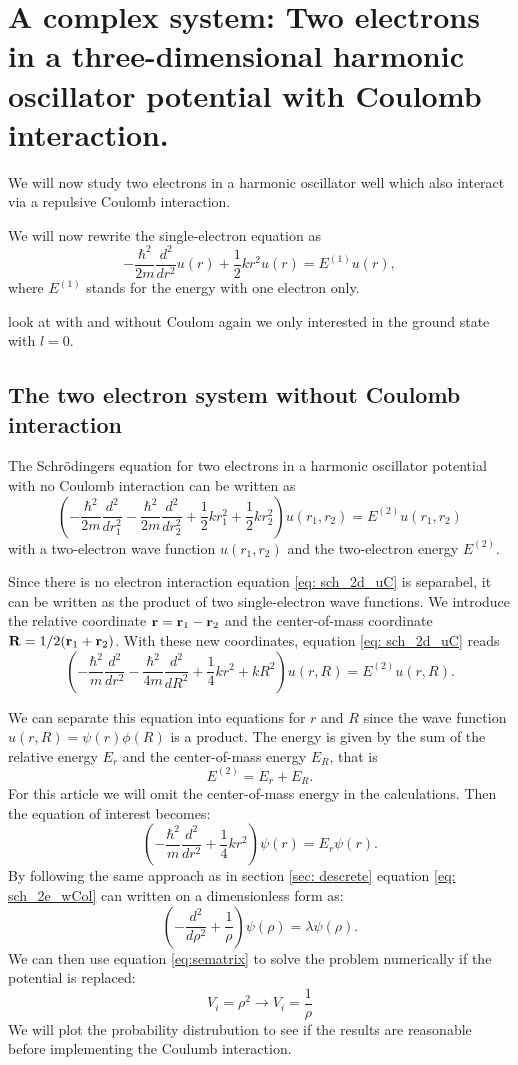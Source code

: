 \documentclass[11pt,a4wide]{article}
\begin{document}
\section{A complex system: Two electrons in a three-dimensional harmonic oscillator potential with Coulomb interaction.}
We will now study two electrons in a harmonic oscillator well which also interact via a repulsive Coulomb interaction.


We will now rewrite the single-electron equation as
\[
  -\frac{\hbar^2}{2 m} \frac{d^2}{dr^2} u(r) 
       + \frac{1}{2}k r^2u(r)  = E^{(1)} u(r),
\]
where $E^{(1)}$ stands for the energy with one electron only.

look at with and without Coulom
again we only interested in the ground state with $l=0$. 


\subsection{The two electron system without Coulomb interaction}
The Schr\"odingers equation for two electrons in a harmonic oscillator potential with no Coulomb interaction can be written as
\begin{equation}
\left(  -\frac{\hbar^2}{2 m} \frac{d^2}{dr_1^2} -\frac{\hbar^2}{2 m} \frac{d^2}{dr_2^2}+ \frac{1}{2}k r_1^2+ \frac{1}{2}k r_2^2\right)u(r_1,r_2)  = E^{(2)} u(r_1,r_2) 
\label{eq: sch_2d_uC}
\end{equation}
with a two-electron wave function $u(r_1,r_2)$ and the two-electron energy $E^{(2)}$.

Since there is no electron interaction equation \ref{eq: sch_2d_uC} is separabel, it can be written as the product of two single-electron wave functions. We introduce the relative coordinate ${\bf r} = {\bf r}_1-{\bf r}_2$ and the center-of-mass coordinate ${\bf R} = 1/2({\bf r}_1+{\bf r}_2)$. With these new coordinates,  equation \ref{eq: sch_2d_uC} reads
\[
\left(  -\frac{\hbar^2}{m} \frac{d^2}{dr^2} -\frac{\hbar^2}{4 m} \frac{d^2}{dR^2}+ \frac{1}{4} k r^2+  kR^2\right)u(r,R)  = E^{(2)} u(r,R).
\]

We can separate this equation into equations for $r$ and $R$ since the wave function $u(r,R) = \psi(r)\phi(R)$ is a product. The energy is given by the sum of the relative energy $E_r$ and the center-of-mass energy $E_R$, that is
\[
E^{(2)}=E_r+E_R.
\]
For this article we will omit the center-of-mass energy in the calculations. Then the equation of interest becomes:
\[
\left(  -\frac{\hbar^2}{m} \frac{d^2}{dr^2}+ \frac{1}{4}k r^2\right)\psi(r)  = E_r \psi(r).
\]
By following the same approach as in section \ref{sec: descrete} equation \ref{eq: sch_2e_wCol} can written on a dimensionless form as:
\[
\left(  - \frac{d^2}{d\rho^2}+ \frac{1}{\rho}\right)\psi(\rho)  = \lambda\psi(\rho).
\]
We can then use equation \ref{eq:sematrix} to solve the problem numerically if the potential is replaced:
\[
V_i = \rho^2 \rightarrow V_i = \frac{1}{\rho}
\]
We will plot the probability distrubution to see if the results are reasonable before implementing the Coulumb interaction.
\end{document}
